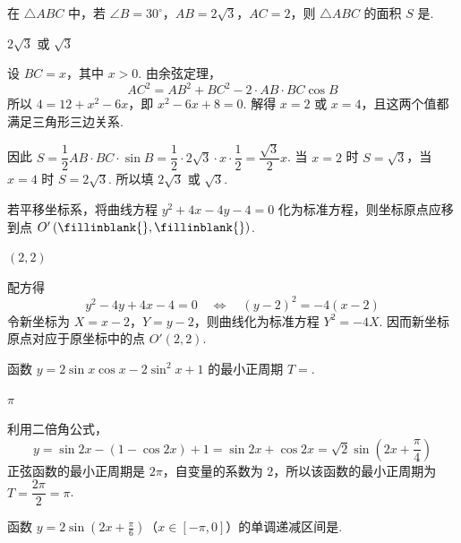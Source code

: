 \begin{problem}
在 \(\triangle ABC\) 中，若 \(\angle B=30^\circ\)，\(AB=2\sqrt{3}\)，\(AC=2\)，则 \(\triangle ABC\) 的面积 \(S\) 是\fillinblank{}.
\end{problem}

\begin{answer}
\(2\sqrt{3}\) 或 \(\sqrt{3}\)
\end{answer}

\begin{solution}
设 \(BC=x\)，其中 \(x>0\). 由余弦定理，
\[
AC^2=AB^2+BC^2-2\cdot AB\cdot BC\cos B
\]
所以 \(4=12+x^2-6x\)，即 \(x^2-6x+8=0\). 解得 \(x=2\) 或 \(x=4\)，且这两个值都满足三角形三边关系.

因此 \(S=\dfrac12AB\cdot BC\cdot\sin B=\dfrac12\cdot2\sqrt3\cdot x\cdot\dfrac12=\dfrac{\sqrt3}{2}x\). 当 \(x=2\) 时 \(S=\sqrt3\)，当 \(x=4\) 时 \(S=2\sqrt3\). 所以填 \(2\sqrt3\) 或 \(\sqrt3\).
\end{solution}

\begin{problem}
若平移坐标系，将曲线方程 \(y^2 + 4x - 4y - 4 = 0\) 化为标准方程，则坐标原点应移到点 \(O'\left(\fillinblank{},\fillinblank{} \right)\).
\end{problem}

\begin{answer}
\((2,2)\)
\end{answer}

\begin{solution}
配方得
\[
y^2-4y+4x-4=0\quad\Longleftrightarrow\quad (y-2)^2=-4(x-2)
\]
令新坐标为 \(X=x-2\)，\(Y=y-2\)，则曲线化为标准方程 \(Y^2=-4X\). 因而新坐标原点对应于原坐标中的点 \(O'(2,2)\).
\end{solution}

\begin{problem}
函数 \(y = 2\sin x \cos x - 2\sin^2 x + 1\) 的最小正周期 \(T=\)\fillinblank{}.
\end{problem}

\begin{answer}
\(\pi\)
\end{answer}

\begin{solution}
利用二倍角公式，
\[
y=\sin2x-\left(1-\cos2x\right)+1=\sin2x+\cos2x=\sqrt2\sin\left(2x+\frac\pi4\right)
\]
正弦函数的最小正周期是 \(2\pi\)，自变量的系数为 \(2\)，所以该函数的最小正周期为 \(T=\dfrac{2\pi}{2}=\pi\).
\end{solution}

\begin{problem}
函数 \(y = 2\sin\left( 2x + \frac{\pi}{6} \right)\)（\(x \in \left[ -\pi, 0 \right]\)）的单调递减区间是\fillinblank{}.
\end{problem}

